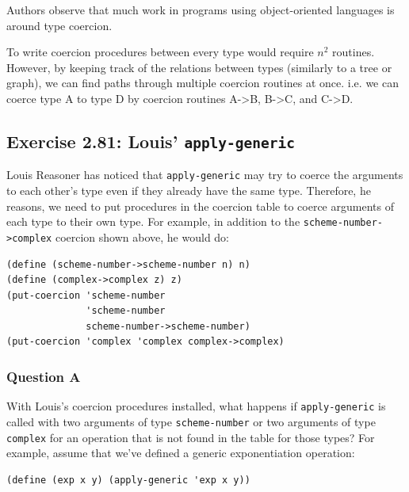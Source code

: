 \documentclass[final,fleqn,titlepage,twoside]{article}
\begin{document}
Authors observe that much work in programs using object-oriented languages is
around type coercion.

To write coercion procedures between every type would require \(n^2\) routines.
However, by keeping track of the relations between types (similarly to a tree or
graph), we can find paths through multiple coercion routines at once. i.e. we
can coerce type A to type D by coercion routines A->B, B->C, and C->D.

\subsection{Exercise 2.81: Louis' \texttt{apply-generic}}
\label{sec:orgb8c21f7}
Louis Reasoner has noticed that \texttt{apply-generic} may try to coerce the
arguments to each other's type even if they already have the same type.
Therefore, he reasons, we need to put procedures in the coercion table to coerce
arguments of each type to their own type. For example, in addition to the
\texttt{scheme-number->complex} coercion shown above, he would do:

\begin{verbatim}
(define (scheme-number->scheme-number n) n)
(define (complex->complex z) z)
(put-coercion 'scheme-number
              'scheme-number
              scheme-number->scheme-number)
(put-coercion 'complex 'complex complex->complex)
\end{verbatim}

\subsubsection{Question A}
\label{sec:org6d4d3f6}
With Louis's coercion procedures installed, what happens if
\texttt{apply-generic} is called with two arguments of type
\texttt{scheme-number} or two arguments of type \texttt{complex} for an
operation that is not found in the table for those types? For example, assume
that we've defined a generic exponentiation operation:

\begin{verbatim}
(define (exp x y) (apply-generic 'exp x y))
\end{verbatim}
\end{document}
